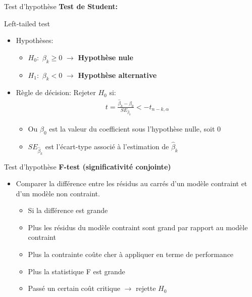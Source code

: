\documentclass{beamer}
\begin{document}
\begin{frame}{Test d'hypothèse}
\textbf{Test de Student:}
\begin{block}{Left-tailed test}
\begin{itemize}
\item Hypothèses:
\begin{itemize}
\item $H_0:$ $\beta_k \geq 0$ $\rightarrow$ \textbf{Hypothèse nule}
\item $H_1:$ $\beta_k < 0$ $\rightarrow$ \textbf{Hypothèse alternative}
\end{itemize}
\item Règle de décision:
Rejeter $H_0$ si:
\begin{align*}
t=\frac{\hat{\beta}_k-\beta_0}{SE_{\hat{\beta}_k}} < -t_{n-k,\alpha}
\end{align*}
\begin{itemize}
\item Ou $\beta_0$ est la valeur du coefficient sous l'hypothèse nulle, soit 0
\item $SE_{\hat{\beta}_k}$ est l'écart-type associé à l'estimation de $\hat{\beta}_k$
\end{itemize}
\end{itemize}
\end{block}
\end{frame}


\begin{frame}{Test d'hypothèse}
\textbf{F-test (significativité conjointe)}
\begin{itemize}
\item Comparer la différence entre les résidus au carrés d'un modèle contraint et d'un modèle non contraint.
\begin{itemize}
\item Si la différence est grande 
\item Plus les résidus du modèle contraint sont grand par rapport au modèle contraint
\item Plus la contrainte coûte cher à appliquer en terme de performance
\item Plus la statistique F est grande
\item Passé un certain coût critique $\rightarrow$ rejette $H_0$
\end{itemize}
\end{itemize}
\end{frame}
\end{document}
